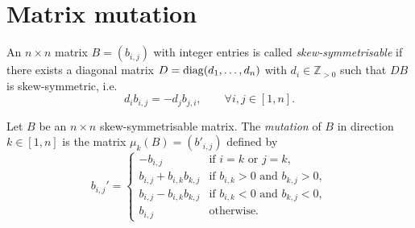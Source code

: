 \chapter{Matrix mutation}

\begin{definition}
    An $n\times n$ matrix $B = (b_{i,j})$ with integer entries is called 
    \emph{skew-symmetrisable} if there exists a diagonal matrix $D = {\rm diag}(d_1, \ldots, d_n)$ 
    with $d_i \in \mathbb{Z}_{>0}$ such that $DB$ is skew-symmetric, i.e. 
    \[
        d_ib_{i,j} = -d_jb_{j,i}, \qquad \forall i,j \in [1,n].
    \]
\end{definition}

\begin{definition}
    Let $B$ be an $n \times n$ skew-symmetrisable matrix. The \emph{mutation} of 
    $B$ in direction $k \in [1,n]$ is the matrix $\mu_k(B) = (b'_{i,j})$ defined by
    \[
        b_{i,j}' = \begin{cases}
            -b_{i,j} & \text{if } i = k \text{ or } j = k, \\
            b_{i,j} + b_{i,k}b_{k,j} & \text{if } b_{i,k} >0 \text{ and } b_{k,j} > 0, \\
            b_{i,j} - b_{i,k}b_{k,j} & \text{if } b_{i,k} <0 \text{ and } b_{k,j} < 0, \\
            b_{i,j} & \text{otherwise.}
        \end{cases}
    \]
\end{definition}

